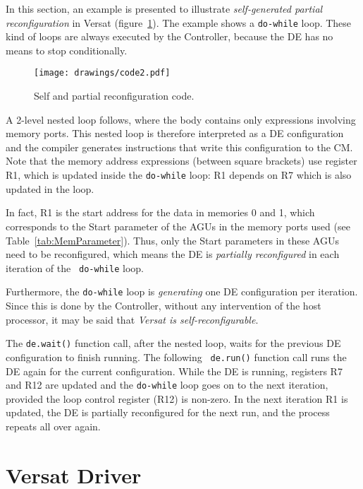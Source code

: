 In this section, an example is presented to illustrate {\em
  self-generated partial reconfiguration} in Versat
(figure~\ref{fig_preconf}). The example shows a {\tt do-while}
loop. These kind of loops are always executed by the Controller,
because the DE has no means to stop conditionally.

\begin{figure}[!htb]
\centering \texttt{[image: drawings/code2.pdf]}
\caption{Self and partial reconfiguration code.}
\label{fig_preconf}
\end{figure}

A 2-level nested loop follows, where the body contains only
expressions involving memory ports. This nested loop is therefore
interpreted as a DE configuration and the compiler generates
instructions that write this configuration to the CM. Note that the
memory address expressions (between square brackets) use register R1,
which is updated inside the {\tt do-while} loop: R1 depends on R7
which is also updated in the loop.

In fact, R1 is the start address for the data in memories 0 and 1,
which corresponds to the Start parameter of the AGUs in the memory
ports used (see Table~\ref{tab:MemParameter}). Thus, only the Start
parameters in these AGUs need to be reconfigured, which means the DE
is {\em partially reconfigured} in each iteration of the {\tt
  do-while} loop.

Furthermore, the {\tt do-while} loop is {\em generating} one DE
configuration per iteration. Since this is done by the Controller,
without any intervention of the host processor, it may be said that
{\em Versat is self-reconfigurable}.

The {\tt de.wait()} function call, after the nested loop, waits for
the previous DE configuration to finish running. The following {\tt
  de.run()} function call runs the DE again for the current
configuration. While the DE is running, registers R7 and R12 are
updated and the {\tt do-while} loop goes on to the next iteration,
provided the loop control register (R12) is non-zero. In the next
iteration R1 is updated, the DE is partially reconfigured for the next
run, and the process repeats all over again.

\section{Versat Driver}
\label{section:drivers}

